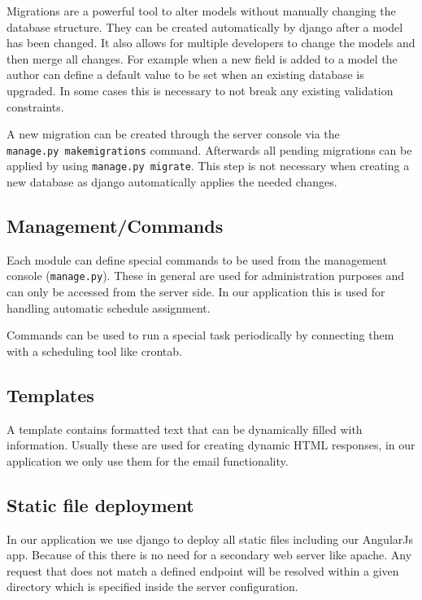 Migrations are a powerful tool to alter models without manually changing
the database structure. They can be created automatically by django
after a model has been changed. It also allows for multiple developers
to change the models and then merge all changes. For example when a new
field is added to a model the author can define a default value to be
set when an existing database is upgraded. In some cases this is
necessary to not break any existing validation constraints.

A new migration can be created through the server console via the
\texttt{manage.py\ makemigrations} command. Afterwards all pending
migrations can be applied by using \texttt{manage.py\ migrate}. This
step is not necessary when creating a new database as django
automatically applies the needed changes.

\subsection{Management/Commands}\label{managementcommands}

Each module can define special commands to be used from the management
console (\texttt{manage.py}). These in general are used for
administration purposes and can only be accessed from the server side.
In our application this is used for handling automatic schedule
assignment.

Commands can be used to run a special task periodically by connecting
them with a scheduling tool like crontab.

\subsection{Templates}\label{templates}

A template contains formatted text that can be dynamically filled with
information. Usually these are used for creating dynamic HTML responses,
in our application we only use them for the email functionality.

\subsection{Static file deployment}\label{static-file-deployment}

In our application we use django to deploy all static files including
our AngularJs app. Because of this there is no need for a secondary web
server like apache. Any request that does not match a defined endpoint
will be resolved within a given directory which is specified inside the
server configuration.

